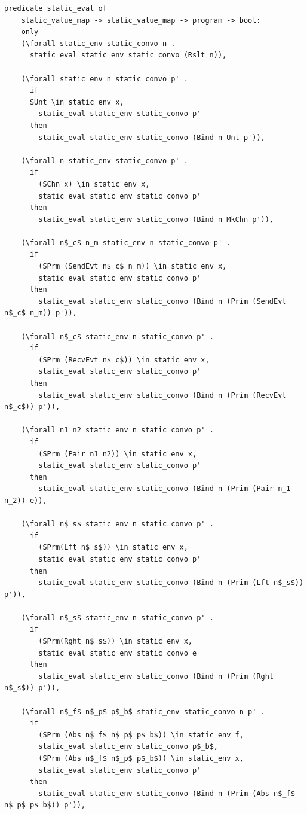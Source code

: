\documentclass[10pt]{article}
\begin{document}
\begin{lstlisting}[language=logic, mathescape]
  predicate static_eval of
    static_value_map -> static_value_map -> program -> bool:
    only
    (\forall static_env static_convo n .
      static_eval static_env static_convo (Rslt n)),

    (\forall static_env n static_convo p' .
      if 
      SUnt \in static_env x,
        static_eval static_env static_convo p'
      then
        static_eval static_env static_convo (Bind n Unt p')),

    (\forall n static_env static_convo p' .
      if 
        (SChn x) \in static_env x,
        static_eval static_env static_convo p'
      then  
        static_eval static_env static_convo (Bind n MkChn p')),

    (\forall n$_c$ n_m static_env n static_convo p' .
      if
        (SPrm (SendEvt n$_c$ n_m)) \in static_env x,
        static_eval static_env static_convo p' 
      then
        static_eval static_env static_convo (Bind n (Prim (SendEvt n$_c$ n_m)) p')),

    (\forall n$_c$ static_env n static_convo p' . 
      if 
        (SPrm (RecvEvt n$_c$)) \in static_env x,
        static_eval static_env static_convo p'
      then
        static_eval static_env static_convo (Bind n (Prim (RecvEvt n$_c$)) p')),

    (\forall n1 n2 static_env n static_convo p' .
      if
        (SPrm (Pair n1 n2)) \in static_env x,
        static_eval static_env static_convo p'
      then
        static_eval static_env static_convo (Bind n (Prim (Pair n_1 n_2)) e)),

    (\forall n$_s$ static_env n static_convo p' .
      if
        (SPrm(Lft n$_s$)) \in static_env x,
        static_eval static_env static_convo p' 
      then
        static_eval static_env static_convo (Bind n (Prim (Lft n$_s$)) p')),

    (\forall n$_s$ static_env n static_convo p' .
      if
        (SPrm(Rght n$_s$)) \in static_env x, 
        static_eval static_env static_convo e
      then
        static_eval static_env static_convo (Bind n (Prim (Rght n$_s$)) p')),

    (\forall n$_f$ n$_p$ p$_b$ static_env static_convo n p' .
      if
        (SPrm (Abs n$_f$ n$_p$ p$_b$)) \in static_env f, 
        static_eval static_env static_convo p$_b$, 
        (SPrm (Abs n$_f$ n$_p$ p$_b$)) \in static_env x, 
        static_eval static_env static_convo p'
      then
        static_eval static_env static_convo (Bind n (Prim (Abs n$_f$ n$_p$ p$_b$)) p')),


\end{lstlisting}
\end{document}
